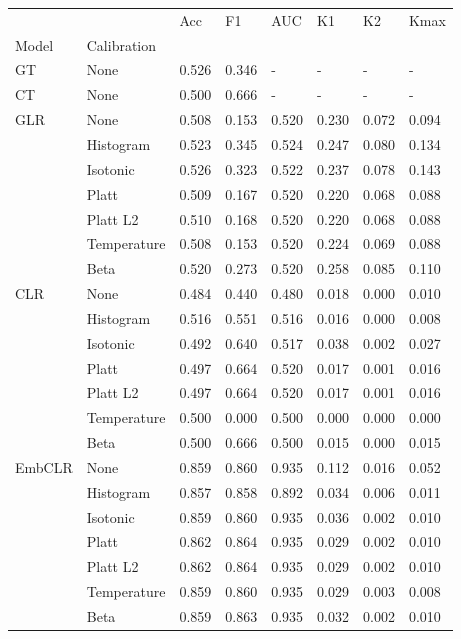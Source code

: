 \begin{tabular}{llllllll}
\toprule
 &  & Acc & F1 & AUC & K1 & K2 & Kmax \\
Model & Calibration &  &  &  &  &  &  \\
\midrule
GT & None & 0.526 & 0.346 & - & - & - & - \\
\cline{1-8}
CT & None & 0.500 & 0.666 & - & - & - & - \\
\cline{1-8}
\multirow[t]{7}{*}{GLR} & None & 0.508 & 0.153 & 0.520 & 0.230 & 0.072 & 0.094 \\
 & Histogram & 0.523 & 0.345 & 0.524 & 0.247 & 0.080 & 0.134 \\
 & Isotonic & 0.526 & 0.323 & 0.522 & 0.237 & 0.078 & 0.143 \\
 & Platt & 0.509 & 0.167 & 0.520 & 0.220 & 0.068 & 0.088 \\
 & Platt L2 & 0.510 & 0.168 & 0.520 & 0.220 & 0.068 & 0.088 \\
 & Temperature & 0.508 & 0.153 & 0.520 & 0.224 & 0.069 & 0.088 \\
 & Beta & 0.520 & 0.273 & 0.520 & 0.258 & 0.085 & 0.110 \\
\cline{1-8}
\multirow[t]{7}{*}{CLR} & None & 0.484 & 0.440 & 0.480 & 0.018 & 0.000 & 0.010 \\
 & Histogram & 0.516 & 0.551 & 0.516 & 0.016 & 0.000 & 0.008 \\
 & Isotonic & 0.492 & 0.640 & 0.517 & 0.038 & 0.002 & 0.027 \\
 & Platt & 0.497 & 0.664 & 0.520 & 0.017 & 0.001 & 0.016 \\
 & Platt L2 & 0.497 & 0.664 & 0.520 & 0.017 & 0.001 & 0.016 \\
 & Temperature & 0.500 & 0.000 & 0.500 & 0.000 & 0.000 & 0.000 \\
 & Beta & 0.500 & 0.666 & 0.500 & 0.015 & 0.000 & 0.015 \\
\cline{1-8}
\multirow[t]{7}{*}{EmbCLR} & None & 0.859 & 0.860 & 0.935 & 0.112 & 0.016 & 0.052 \\
 & Histogram & 0.857 & 0.858 & 0.892 & 0.034 & 0.006 & 0.011 \\
 & Isotonic & 0.859 & 0.860 & 0.935 & 0.036 & 0.002 & 0.010 \\
 & Platt & 0.862 & 0.864 & 0.935 & 0.029 & 0.002 & 0.010 \\
 & Platt L2 & 0.862 & 0.864 & 0.935 & 0.029 & 0.002 & 0.010 \\
 & Temperature & 0.859 & 0.860 & 0.935 & 0.029 & 0.003 & 0.008 \\
 & Beta & 0.859 & 0.863 & 0.935 & 0.032 & 0.002 & 0.010 \\
\cline{1-8}
\bottomrule
\end{tabular}
